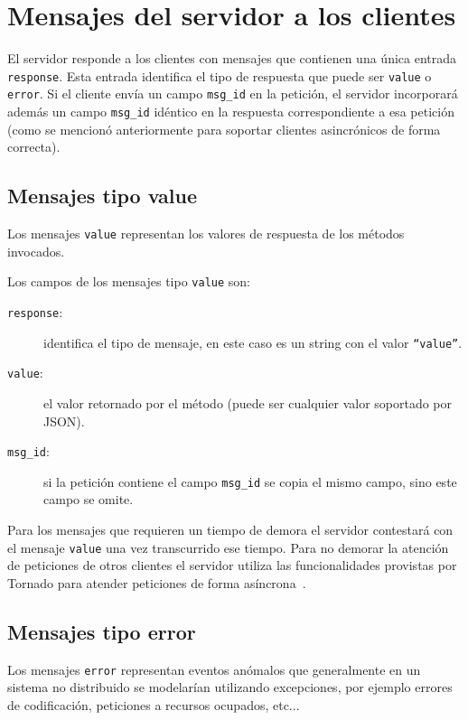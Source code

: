 \section{Mensajes del servidor a los clientes}

El servidor responde a los clientes con mensajes que contienen una única
entrada \texttt{response}. Esta entrada identifica el tipo de respuesta
que puede ser \texttt{value} o \texttt{error}. Si el cliente envía un
campo \texttt{msg\_id} en la petición, el servidor incorporará además
un campo \texttt{msg\_id} idéntico en la respuesta correspondiente
a esa petición (como se mencionó anteriormente para soportar
clientes asincrónicos de forma correcta).

\subsection{Mensajes tipo value}

Los mensajes \texttt{value} representan los valores de respuesta de
los métodos invocados.

Los campos de los mensajes tipo \texttt{value} son:

\begin{description}
    \item[\texttt{response}:] identifica el tipo de mensaje, en este caso
        es un string con el valor \texttt{``value''}.
    \item[\texttt{value}:] el valor retornado por el método (puede ser
        cualquier valor soportado por JSON).
    \item[\texttt{msg\_id}:] si la petición contiene el campo \texttt{msg\_id} se
        copia el mismo campo, sino este campo se omite.
\end{description}

Para los mensajes que requieren
un tiempo de demora el servidor contestará con el mensaje \texttt{value}
una vez transcurrido ese tiempo. Para no demorar la atención de peticiones
de otros clientes el servidor utiliza las funcionalidades provistas por
Tornado para atender peticiones de forma asíncrona~\citep{dory_2012}.

\subsection{Mensajes tipo error}

Los mensajes \texttt{error} representan eventos anómalos que
generalmente en un sistema no distribuido se modelarían utilizando
excepciones, por ejemplo errores de codificación, peticiones a recursos
ocupados, etc...

